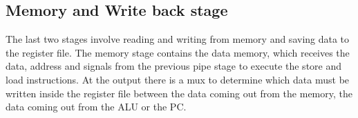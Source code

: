 \subsection{Memory and Write back stage}
The last two stages involve reading and writing from memory and saving data to the register file.
The memory stage contains the data memory, which receives the data, address and signals from the previous pipe stage to execute the store and load instructions. At the output there is a mux to determine which data must be written inside the register file between the data coming out from the memory, the data coming out from the ALU or the PC.

